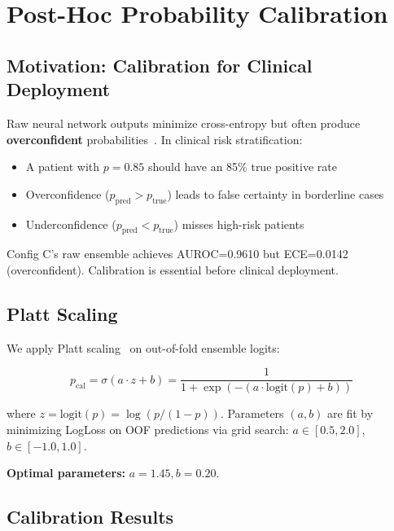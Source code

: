 \section{Post-Hoc Probability Calibration}
\label{sec:calibration}

\subsection{Motivation: Calibration for Clinical Deployment}
\label{sec:cal_motivation}

Raw neural network outputs minimize cross-entropy but often produce \textbf{overconfident} probabilities~\cite{guo2017calibration}. In clinical risk stratification:
\begin{itemize}
    \item A patient with $p=0.85$ should have an 85\% true positive rate
    \item Overconfidence ($p_{\text{pred}} > p_{\text{true}}$) leads to false certainty in borderline cases
    \item Underconfidence ($p_{\text{pred}} < p_{\text{true}}$) misses high-risk patients
\end{itemize}

Config C's raw ensemble achieves AUROC=0.9610 but ECE=0.0142 (overconfident). Calibration is essential before clinical deployment.

\subsection{Platt Scaling}
\label{sec:platt}

We apply Platt scaling~\cite{platt1999probabilistic} on out-of-fold ensemble logits:

\begin{equation}
p_{\text{cal}} = \sigma(a \cdot z + b) = \frac{1}{1 + \exp(-(a \cdot \text{logit}(p) + b))}
\end{equation}

where $z = \text{logit}(p) = \log(p / (1-p))$. Parameters $(a,b)$ are fit by minimizing LogLoss on OOF predictions via grid search: $a \in [0.5, 2.0]$, $b \in [-1.0, 1.0]$.

\textbf{Optimal parameters:} $a=1.45, b=0.20$.

\subsection{Calibration Results}
\label{sec:cal_results}

